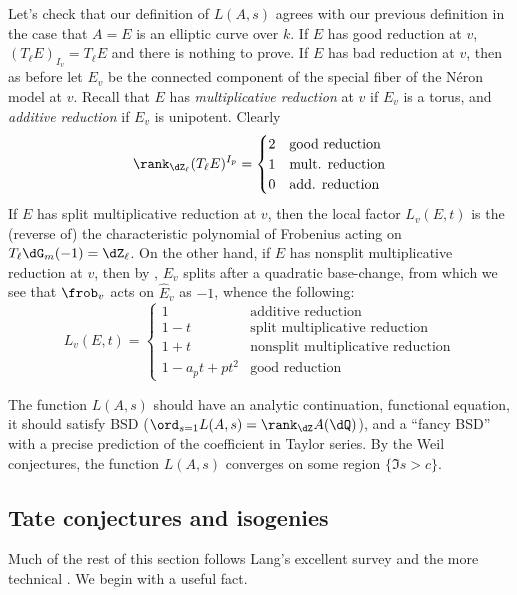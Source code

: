 Let's check that our definition of $L(A,s)$ agrees with our previous definition 
in the case that $A=E$ is an elliptic curve over $k$. If $E$ has good reduction 
at $v$, $(T_\ell E)_{I_v}=T_\ell E$ and there is nothing to prove. If $E$ has 
bad reduction at $v$, then as before let $E_v$ be the connected component 
of the special fiber of the N\'eron model at $v$. Recall that $E$ has 
\emph{multiplicative reduction} at $v$ if $E_v$ is a torus, and \emph{additive 
reduction} if $E_v$ is unipotent. Clearly  
\[
  \rank_{\dZ_\ell} (T_\ell E)^{I_p}
  =
  \begin{cases}
    2 & \text{good reduction} \\
    1 & \text{mult. reduction} \\
    0 & \text{add. reduction}
  \end{cases}
\]
If $E$ has split multiplicative reduction at $v$, then the local factor 
$L_v(E,t)$ is the (reverse of) the characteristic polynomial of Frobenius 
acting on $T_\ell \dG_m(-1) = \dZ_\ell$. On the other hand, if $E$ has 
nonsplit multiplicative reduction at $v$, then by \cite[III,2.5]{si06}, 
$E_v$ splits after a quadratic base-change, from which we see that 
$\frob_v$ acts on $\widehat E_v$ as $-1$, whence the following: 
\[
  L_v(E,t) = 
    \begin{cases}
      1 & \text{additive reduction} \\
      1-t & \text{split multiplicative reduction} \\
      1+t & \text{nonsplit multiplicative reduction} \\
      1 - a_p t + p t^2 & \text{good reduction} 
    \end{cases}
\]

The function $L(A,s)$ should have an analytic continuation, functional equation, 
it should satisfy BSD ($\ord_{s=1} L(A,s) = \rank_\dZ A(\dQ)$), and a ``fancy BSD'' 
with a precise prediction of the coefficient in Taylor series. 
By the Weil conjectures, the function $L(A,s)$ converges on some region 
$\{\Im s>c\}$. 





\subsection{Tate conjectures and isogenies}

Much of the rest of this section follows Lang's excellent survey 
\cite{la91} and the more technical \cite{fa84}. We begin with a useful fact. 

